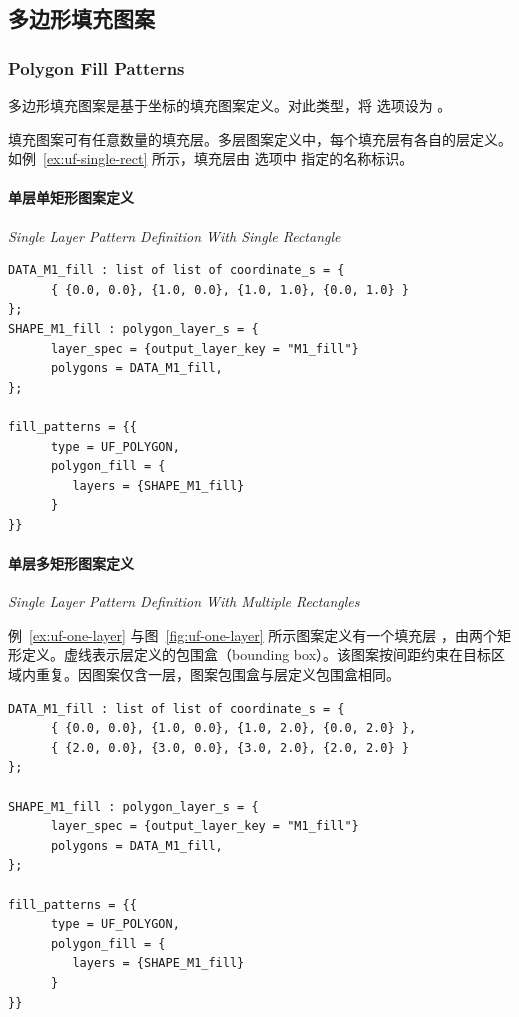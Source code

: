 \subsection{多边形填充图案}
\subsubsection*{Polygon Fill Patterns}

多边形填充图案是基于坐标的填充图案定义。对此类型，将  选项设为 。

填充图案可有任意数量的填充层。多层图案定义中，每个填充层有各自的层定义。如例~\ref{ex:uf-single-rect} 所示，填充层由  选项中  指定的名称标识。

\paragraph{单层单矩形图案定义}
\textit{Single Layer Pattern Definition With Single Rectangle}

\begin{lstlisting}[style=pxl,caption={单层单矩形图案定义},label={ex:uf-single-rect}]
DATA_M1_fill : list of list of coordinate_s = {
      { {0.0, 0.0}, {1.0, 0.0}, {1.0, 1.0}, {0.0, 1.0} }
};
SHAPE_M1_fill : polygon_layer_s = {
      layer_spec = {output_layer_key = "M1_fill"}
      polygons = DATA_M1_fill,
};

fill_patterns = {{
      type = UF_POLYGON,
      polygon_fill = {
         layers = {SHAPE_M1_fill}
      }
}}
\end{lstlisting}

\paragraph{单层多矩形图案定义}
\textit{Single Layer Pattern Definition With Multiple Rectangles}

例~\ref{ex:uf-one-layer} 与图~\ref{fig:uf-one-layer} 所示图案定义有一个填充层 ，由两个矩形定义。虚线表示层定义的包围盒（bounding box）。该图案按间距约束在目标区域内重复。因图案仅含一层，图案包围盒与层定义包围盒相同。

\begin{lstlisting}[style=pxl,caption={使用 UF\_POLYGON 类型的单填充层示例},label={ex:uf-one-layer}]
DATA_M1_fill : list of list of coordinate_s = {
      { {0.0, 0.0}, {1.0, 0.0}, {1.0, 2.0}, {0.0, 2.0} },
      { {2.0, 0.0}, {3.0, 0.0}, {3.0, 2.0}, {2.0, 2.0} }
};

SHAPE_M1_fill : polygon_layer_s = {
      layer_spec = {output_layer_key = "M1_fill"}
      polygons = DATA_M1_fill,
};

fill_patterns = {{
      type = UF_POLYGON,
      polygon_fill = {
         layers = {SHAPE_M1_fill}
      }
}}
\end{lstlisting}

